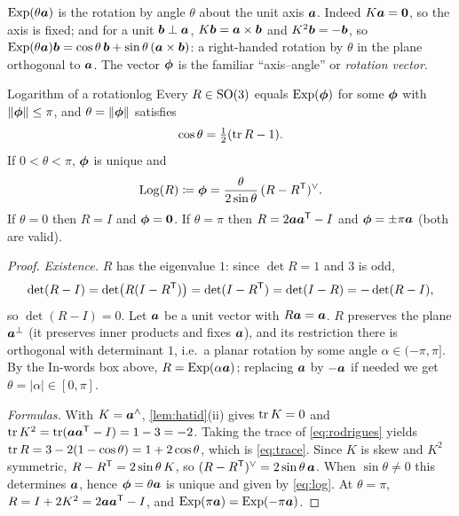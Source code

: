 \begin{inwords}
$\operatorname{Exp}(\theta\bm{a})$ is the rotation by angle $\theta$ about the unit
axis $\bm{a}$. Indeed $K\bm{a}=\bm{0}$, so the axis is fixed; and
for a unit $\bm{b}\perp\bm{a}$, $K\bm{b}=\bm{a}\times\bm{b}$ and
$K^2\bm{b}=-\bm{b}$, so $\operatorname{Exp}(\theta\bm{a})\bm{b}=\cos\theta\,
\bm{b}+\sin\theta\,(\bm{a}\times\bm{b})$: a right-handed rotation
by $\theta$ in the plane orthogonal to $\bm{a}$. The vector $\bm{\phi}$ is
the familiar ``axis--angle'' or \emph{rotation vector}.
\end{inwords}

\begin{proposition}{Logarithm of a rotation}{log}
Every $R\in\mathrm{SO}(3)$ equals $\operatorname{Exp}(\bm{\phi})$ for some $\bm{\phi}$ with
$\left\lVert \bm{\phi}\right\rVert\le\pi$, and $\theta=\left\lVert \bm{\phi}\right\rVert$ satisfies
\begin{equation}\label{eq:trace}
\cos\theta=\tfrac12(\operatorname{tr} R-1).
\end{equation}
If $0<\theta<\pi$, $\bm{\phi}$ is unique and
\begin{equation}\label{eq:log}
\operatorname{Log}(R)\coloneqq\bm{\phi}=\frac{\theta}{2\sin\theta}\,(R-R^{\mathsf{T}})^{\vee} .
\end{equation}
If $\theta=0$ then $R=I$ and $\bm{\phi}=\bm{0}$. If $\theta=\pi$ then
$R=2\bm{a}\bm{a}^{\mathsf{T}}-I$ and $\bm{\phi}=\pm\pi\bm{a}$ (both are valid).
\end{proposition}

\begin{proof}
\emph{Existence.} $R$ has the eigenvalue $1$: since $\det R=1$ and $3$ is
odd,
\[
\det(R-I)=\det\bigl(R(I-R^{\mathsf{T}})\bigr)=\det(I-R^{\mathsf{T}})=\det(I-R)=-\det(R-I),
\]
so $\det(R-I)=0$. Let $\bm{a}$ be a unit vector with $R\bm{a}=
\bm{a}$. $R$ preserves the plane $\bm{a}^\perp$ (it preserves inner
products and fixes $\bm{a}$), and its restriction there is orthogonal
with determinant $1$, i.e.\ a planar rotation by some angle
$\alpha\in(-\pi,\pi]$. By the In-words box above,
$R=\operatorname{Exp}(\alpha\bm{a})$; replacing $\bm{a}$ by $-\bm{a}$ if needed
we get $\theta=|\alpha|\in[0,\pi]$.

\emph{Formulas.} With $K=\bm{a}^{\wedge}$, \cref{lem:hatid}(ii) gives
$\operatorname{tr} K=0$ and $\operatorname{tr} K^2=\operatorname{tr}(\bm{a}\bm{a}^{\mathsf{T}}-I)=1-3=-2$. Taking the
trace of \eqref{eq:rodrigues} yields $\operatorname{tr} R=3-2(1-\cos\theta)=1+2\cos
\theta$, which is \eqref{eq:trace}. Since $K$ is skew and $K^2$
symmetric, $R-R^{\mathsf{T}}=2\sin\theta\,K$, so $(R-R^{\mathsf{T}})^{\vee}=2\sin\theta\,
\bm{a}$. When $\sin\theta\neq0$ this determines $\bm{a}$, hence
$\bm{\phi}=\theta\bm{a}$ is unique and given by \eqref{eq:log}. At
$\theta=\pi$, $R=I+2K^2=2\bm{a}\bm{a}^{\mathsf{T}}-I$, and $\operatorname{Exp}(\pi\bm{a})=
\operatorname{Exp}(-\pi\bm{a})$.
\end{proof}

